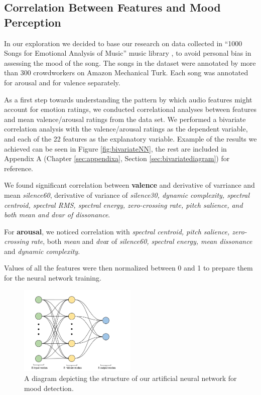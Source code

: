 \vspace{10pt}

\subsection{Correlation Between Features and Mood Perception}

In our exploration we decided to base our research on data collected in ``1000 Songs for Emotional Analysis of Music'' music library \cite{1000songs}, to avoid personal bias in assessing the mood of the song. The songs in the dataset were annotated by more than 300 crowdworkers on Amazon Mechanical Turk. Each song was annotated for arousal and for valence separately.

As a first step towards understanding the pattern by which audio features might account for emotion ratings, we conducted correlational analyses between features and mean valence/arousal ratings from the data set. We performed a bivariate correlation analysis with the valence/arousal ratings as the dependent variable, and each of the 22 features as the explanatory variable. Example of the results we achieved can be seen in Figure \ref{fig:bivariateNN}, the rest are included in Appendix A (Chapter \ref{sec:appendixa}, Section \ref{sec:bivariatediagram}) for reference. 

We found significant correlation between \textbf{valence} and derivative of varriance and mean \textit{silence60}, derivative of variance of \textit{silence30, dynamic complexity, spectral centroid, spectral RMS, spectral energy, zero-crossing rate, pitch salience, and both mean and dvar of dissonance}. 

For \textbf{arousal}, we noticed correlation with \textit{spectral centroid, pitch salience, zero-crossing rate}, both \textit{mean} and \textit{dva}r of  \textit{silence60, spectral energy, mean dissonance} and \textit{dynamic complexity}. 

Values of all the features were then normalized between 0 and 1 to prepare them for the neural network training. 



\begin{figure}
  \vspace{-30pt}
  \begin{center}
    \includegraphics[width=0.5\textwidth]{Figures/myANN}
  \end{center}
  \caption{A diagram depicting the structure of our artificial neural network for mood detection.}
\label{finalnetwork}
\end{figure}

